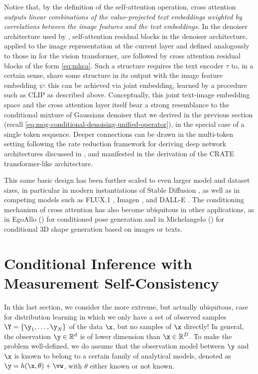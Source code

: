 \documentclass[../../book-main_zh.tex]{subfiles}
\begin{document}
Notice that, by the definition of the self-attention operation, cross attention
\textit{outputs linear combinations of the value-projected text embeddings
weighted by correlations between the image features and the text embeddings.}
In the denoiser architecture used by \textcite{rombach2022high},
self-attention residual blocks in the denoiser architecture, applied to the
image representation at the current layer and defined analogously
to those in  for the vision transformer, are
followed by cross
attention residual blocks of the form \eqref{eq:mhca}.
Such a structure requires the text encoder $\tau$ to, in a certain
sense, share some
structure in its output with the image feature embedding $\psi$: this can be
achieved via joint
embedding, learned by a procedure such as CLIP as described above.
Conceptually, this joint text-image embedding space and the cross attention
layer itself bear a strong resemblance to the
conditional mixture of Gaussians denoiser that we derived in the previous
section (recall \eqref{eq:mog-conditional-denoising-unified-operator}), in the
special case of a single token sequence. Deeper
connections can be drawn in the multi-token setting following the rate reduction
framework for deriving deep network architectures discussed in
, and manifested in the derivation of the CRATE
transformer-like architecture.

This same basic design has been further scaled to even larger model and dataset
sizes, in particular in modern instantiations of Stable Diffusion
\cite{DBLP:conf/icml/EsserKBEMSLLSBP24}, as well as in competing models such as
FLUX.1 \cite{Labs2025-fb}, Imagen \cite{Saharia2022-na}, and DALL-E
\cite{Ramesh2022-nu}.
The conditioning mechanism of cross attention has also become ubiquitous in
other applications, as in EgoAllo () for
conditioned pose generation and in Michelangelo
() for conditional 3D shape generation based
on images or texts.

\section{Conditional Inference with Measurement Self-Consistency}
\label{sec:measurement-self-consistency}
In this last section, we consider the more extreme, but actually
ubiquitous, case for distribution learning in which we only have a
set of observed samples $\Y = \{\y_1,\ldots, \y_N\}$ of the data
$\x$, but no samples of $\x$ directly! In general, the observation
$\y \in \mathbb{R}^d$ is of lower dimension than $\x \in
\mathbb{R}^D$. To make the problem well-defined, we do assume that
the observation model between $\y$ and $\x$ is known to belong to a
certain family of analytical models, denoted as $\y = h(\x, \theta)
+\vw$, with $\theta$ either known or not known.
\end{document}
